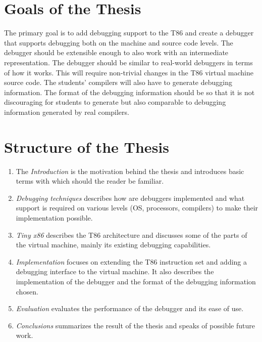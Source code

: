 \section{Goals of the Thesis}
The primary goal is to add debugging support to the T86 and create a debugger
that supports debugging both on the machine and source code levels. The
debugger should be extensible enough to also work with an intermediate
representation. The debugger should be similar to real-world debuggers in terms
of how it works. This will require non-trivial changes in the T86 virtual
machine source code. The students' compilers will also have to generate
debugging information. The format of the debugging information should be so
that it is not discouraging for students to generate but also comparable to
debugging information generated by real compilers.

\section{Structure of the Thesis}
\begin{enumerate}
    \item The \textit{Introduction} is the motivation behind the thesis and
        introduces basic terms with which should the reader be familiar.
    \item \textit{Debugging techniques} describes how are debuggers implemented
        and what support is required on various levels (OS, processors,
        compilers) to make their implementation possible.
    \item \textit{Tiny x86} describes the T86 architecture and discusses some
        of the parts of the virtual machine, mainly its existing debugging
        capabilities.
    \item \textit{Implementation} focuses on extending the T86 instruction set
        and adding a debugging interface to the virtual machine. It also
        describes the implementation of the debugger and the format of the
        debugging information chosen.
    \item \textit{Evaluation} evaluates the performance of the debugger and its
        ease of use.
    \item \textit{Conclusions} summarizes the result of the thesis and speaks
        of possible future work.
\end{enumerate}
